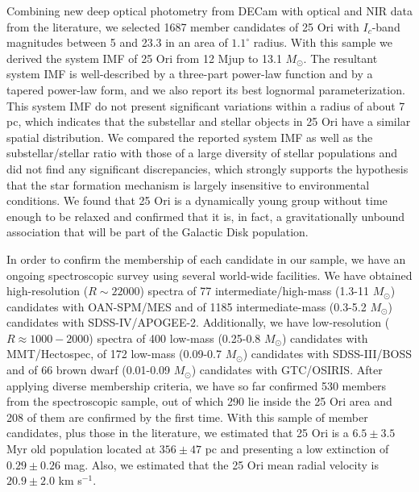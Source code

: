 \documentclass[12pt]{article}
\begin{document}
Combining new deep optical photometry from DECam with optical and NIR data from the literature, we selected 1687 member candidates of 25 Ori with $I_c$-band magnitudes between 5 and 23.3 in an area of $1.1^\circ$ radius. With this sample we derived the system IMF of 25 Ori from 12 \ac{Mjup} to 13.1 $M_\odot$. The resultant system IMF is well-described by a three-part power-law function and by a tapered power-law form, and we also report its best lognormal parameterization. This system IMF do not present significant variations within a radius of about 7 pc, which indicates that the substellar and stellar objects in 25 Ori have a similar spatial distribution. We compared the reported system IMF as well as the substellar/stellar ratio with those of a large diversity of stellar populations and did not find any significant discrepancies, which strongly supports the hypothesis that the star formation mechanism is largely insensitive to environmental conditions. We found that 25 Ori is a dynamically young group without time enough to be relaxed and confirmed that it is, in fact, a gravitationally unbound association that will be part of the Galactic Disk population.

In order to confirm the membership of each candidate in our sample, we have an ongoing spectroscopic survey using several world-wide facilities. We have obtained high-resolution ($R\sim22000$) spectra of 77 intermediate/high-mass (1.3-11 $M_\odot$) candidates with OAN-SPM/MES and of 1185 intermediate-mass (0.3-5.2 $M_\odot$) candidates with SDSS-IV/APOGEE-2. Additionally, we have low-resolution ($R\approx1000-2000$) spectra of 400 low-mass (0.25-0.8 $M_\odot$) candidates with MMT/Hectospec, of 172 low-mass (0.09-0.7 $M_\odot$) candidates with SDSS-III/BOSS and of 66 brown dwarf (0.01-0.09 $M_\odot$) candidates with GTC/OSIRIS. After applying diverse membership criteria, we have so far confirmed 530 members from the spectroscopic sample, out of which 290 lie inside the 25 Ori area and 208 of them are confirmed by the first time. With this sample of member candidates, plus those in the literature, we estimated that 25 Ori is a $6.5\pm3.5$ Myr old population located at $356\pm47$ pc and presenting a low extinction of $0.29\pm0.26$ mag. Also, we estimated that the 25 Ori mean radial velocity is $20.9\pm2.0$ km s$^{-1}$. %
\end{document}
